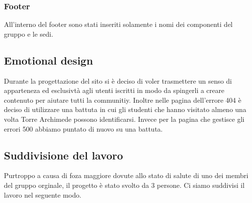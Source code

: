 \subsubsection{Footer}
All'interno del footer sono stati inseriti solamente i nomi dei componenti del gruppo e le sedi.

\subsection{Emotional design}
Durante la progettazione del sito si è deciso di voler trasmettere un senso di apparteneza ed esclusivtà agli utenti iscritti in modo da spingerli a creare contenuto per aiutare tutti la communitiy.
Inoltre nelle pagina dell'errore 404 è deciso di utilizzare una battuta in cui gli studenti che hanno visitato almeno una volta Torre Archimede possono identificarsi. Invece per la pagina che gestisce gli errori 500 abbiamo puntato di nuovo su una battuta.

\subsection{Suddivisione del lavoro}
Purtroppo a causa di foza maggiore dovute allo stato di salute di uno dei membri del gruppo orginale, il progetto è stato svolto da 3 persone. Ci siamo suddivisi il lavoro nel seguente modo.

